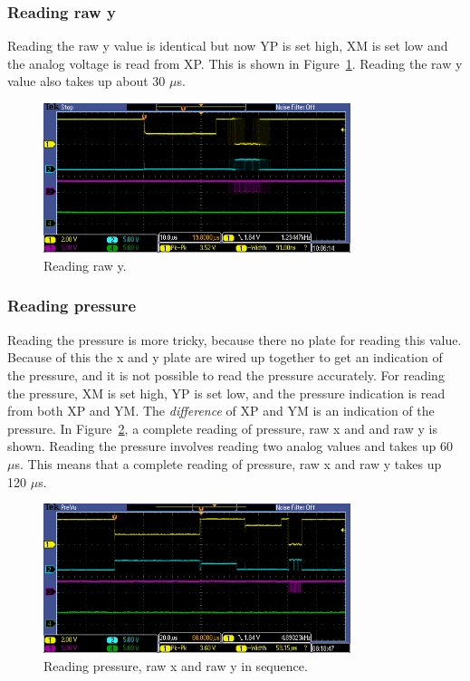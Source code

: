 \documentclass[12pt]{article}
\begin{document}
\subsubsection{Reading raw y}
Reading the raw y value is identical but now YP is set high, XM is set low and the analog voltage is read from XP. This is shown in Figure~\ref{fig:22}. Reading the raw y value also takes up about 30 $\mu$s.

\begin{figure}[!ht]
\centering
\includegraphics[width=0.8\textwidth]{sample_y}
\caption{Reading raw y.}
\label{fig:22}
\end{figure}


\subsubsection{Reading pressure}
Reading the pressure is more tricky, because there no plate for reading this value. Because of this the x and y plate are wired up together to get an indication of the pressure, and it is not possible to read the pressure accurately. For reading the pressure, XM is set high, YP is set low, and the pressure indication is read from both XP and YM. The \textsl{difference} of XP and YM is an indication of the pressure. In Figure~\ref{fig:26}, a complete reading of pressure, raw x and and raw y is shown. Reading the pressure involves reading two analog values and takes up 60 $\mu$s. This means that a complete reading of pressure, raw x and raw y takes up 120 $\mu$s.

\begin{figure}[!ht]
\centering
\includegraphics[width=0.8\textwidth]{sample_pressure_x_y}
\caption{Reading pressure, raw x and\textbf{} raw y in sequence.}
\label{fig:26}
\end{figure}
\end{document}
